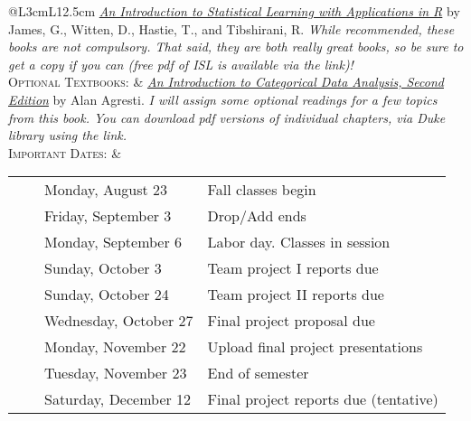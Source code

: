 \documentclass[11pt, a4paper]{article}
\newcommand{\tabitem}{~~\llap{\textbullet}~~}
\begin{document}
\begin{center}
\begin{minipage}[t]{.95\textwidth}
\begin{tabular}{@{}L{3cm}L{12.5cm}}
\newline  \href{http://faculty.marshall.usc.edu/gareth-james/ISL/}{\textit{An Introduction to Statistical Learning with Applications in R}} by James, G., Witten, D., Hastie, T., and Tibshirani, R.
\newline \textit{While recommended, these books are not compulsory. That said, they are both really great books, so be sure to get a copy if you can (free pdf of ISL is available via the link)!}\\ 
\textsc{Optional Textbooks:}	& \href{https://find.library.duke.edu/catalog/DUKE005142588}{\textit{An Introduction to Categorical Data Analysis, Second Edition}} by Alan Agresti.
\newline \textit{I will assign some optional readings for a few topics from this book. You can download pdf versions of individual chapters, via Duke library using the link.}\\ 
\textsc{Important Dates:} & \begin{minipage}[t]{.95\textwidth}
	\begin{tabular}{@{}ll}
		\tabitem Monday, August 23	& Fall classes begin \\
		\tabitem Friday, September 3	& Drop/Add ends \\
		\tabitem Monday, September 6 & Labor day. Classes in session \\
		\tabitem Sunday, October 3 & Team project I reports due \\
		\tabitem Sunday, October 24 & Team project II reports due \\
		\tabitem Wednesday, October 27 & Final project proposal due \\
		\tabitem Monday, November 22 & Upload final project presentations \\
		\tabitem Tuesday, November 23 &	End of semester \\
		\tabitem Saturday, December 12 &	Final project reports due (tentative) \\
	\end{tabular}
\end{minipage} \\
	 \bottomrule[0.065cm]
\end{tabular}
\end{minipage}
\end{center}


\vspace{.5cm}
\setlength{\unitlength}{1in}
\renewcommand{\arraystretch}{1.5}
\end{document}

